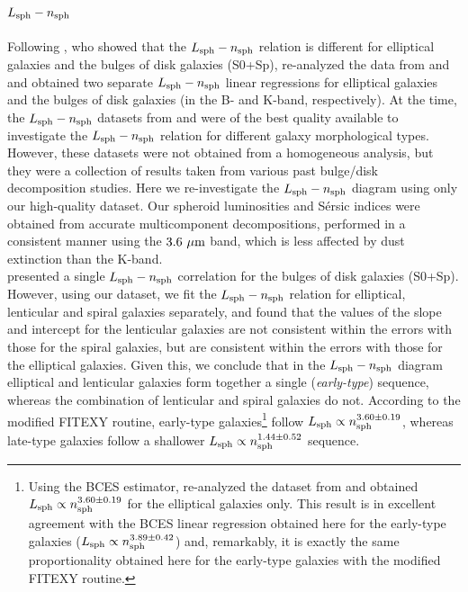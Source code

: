 \documentclass[preprint2]{emulateapj}
\begin{document}
\subsection{$L_{\rm sph} - n_{\rm sph}$}
Following \cite{graham2001bulges}, 
who showed that the $L_{\rm sph} - n_{\rm sph}$ relation is different for elliptical galaxies and the bulges of disk galaxies (S0+Sp), 
\cite{savorgnan2013} re-analyzed the data from \cite{grahamguzman2003} and \cite{grahamworley2008} 
and obtained two separate $L_{\rm sph} - n_{\rm sph}$ linear regressions for elliptical galaxies and the bulges of disk galaxies 
(in the B- and K-band, respectively). 
At the time, the $L_{\rm sph} - n_{\rm sph}$ datasets from \cite{grahamguzman2003} and \cite{grahamworley2008} were of the best quality available 
to investigate the $L_{\rm sph} - n_{\rm sph}$ relation for different galaxy morphological types. 
However, these datasets were not obtained from a homogeneous analysis, 
but they were a collection of results taken from various past bulge/disk decomposition studies. 
Here we re-investigate the $L_{\rm sph} - n_{\rm sph}$ diagram using only our high-quality dataset. 
Our spheroid luminosities and S\'ersic indices were obtained from accurate multicomponent decompositions,  
performed in a consistent manner using the $3.6\rm~\mu m$ band, which is less affected by dust extinction than the K-band. \\
\cite{grahamworley2008} presented a single $L_{\rm sph} - n_{\rm sph}$ correlation for the bulges of disk galaxies (S0+Sp).
However, using our dataset, 
we fit the $L_{\rm sph} - n_{\rm sph}$ relation for elliptical, lenticular and spiral galaxies separately, 
and found that the values of the slope and intercept for the lenticular galaxies 
are not consistent within the errors with those for the spiral galaxies, 
but are consistent within the errors with those for the elliptical galaxies.  
Given this, we conclude that in the $L_{\rm sph} - n_{\rm sph}$ diagram 
elliptical and lenticular galaxies form together a single (\emph{early-type}) sequence, 
whereas the combination of lenticular and spiral galaxies do not. 
According to the modified FITEXY routine, 
early-type galaxies\footnote{Using the BCES estimator, 
\cite{savorgnan2013} re-analyzed the dataset from \cite{grahamguzman2003} 
and obtained $L_{\rm sph} \propto n_{\rm sph}^{3.60 \pm 0.19}$ for the elliptical galaxies only. 
This result is in excellent agreement with the BCES linear regression obtained here for the early-type galaxies 
($L_{\rm sph} \propto n_{\rm sph}^{3.89 \pm 0.42}$) 
and, remarkably, it is exactly the same proportionality obtained here for the early-type galaxies with the modified FITEXY routine. } 
follow $L_{\rm sph} \propto n_{\rm sph}^{3.60 \pm 0.19}$, 
whereas late-type galaxies follow a shallower $L_{\rm sph} \propto n_{\rm sph}^{1.44 \pm 0.52}$ sequence. 
\end{document}
